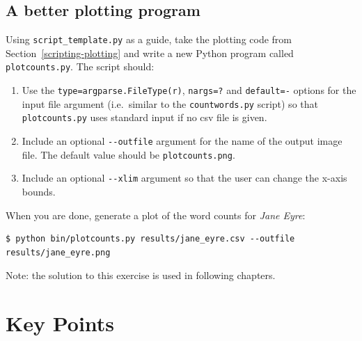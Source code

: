 \documentclass[
]{krantz}
\begin{document}
\hypertarget{scripting-ex-better-plotting}{%
\subsection{A better plotting program}\label{scripting-ex-better-plotting}}

Using \texttt{script\_template.py} as a guide,
take the plotting code from Section~\ref{scripting-plotting}
and write a new Python program called \texttt{plotcounts.py}.
The script should:

\begin{enumerate}
\def\labelenumi{\arabic{enumi}.}
\item
  Use the \texttt{type=argparse.FileType(\textquotesingle{}r\textquotesingle{})}, \texttt{nargs=\textquotesingle{}?\textquotesingle{}} and \texttt{default=\textquotesingle{}-\textquotesingle{}} options
  for the input file argument (i.e.~similar to the \texttt{countwords.py} script)
  so that \texttt{plotcounts.py} uses standard input if no csv file is given.
\item
  Include an optional \texttt{-\/-outfile} argument for the name of the output image file.
  The default value should be \texttt{plotcounts.png}.
\item
  Include an optional \texttt{-\/-xlim} argument so that the user can change the x-axis bounds.
\end{enumerate}

When you are done,
generate a plot of the word counts for \emph{Jane Eyre}:

\begin{verbatim}
$ python bin/plotcounts.py results/jane_eyre.csv --outfile results/jane_eyre.png
\end{verbatim}

Note:
the solution to this exercise is used in following chapters.

\hypertarget{scripting-keypoints}{%
\section{Key Points}\label{scripting-keypoints}}
\end{document}
